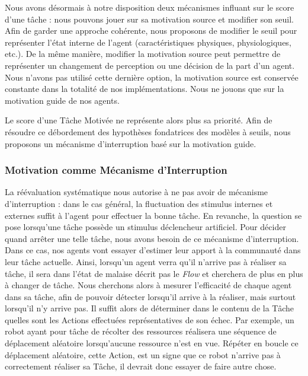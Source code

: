 			Nous avons désormais à notre disposition deux mécanismes influant sur le score d'une tâche : nous pouvons jouer sur sa motivation source et modifier son seuil. Afin de garder une approche cohérente, nous proposons de modifier le seuil pour représenter l'état interne de l'agent (caractéristiques physiques, physiologiques, etc.). De la même manière, modifier la motivation source peut permettre de représenter un changement de perception ou une décision de la part d'un agent. Nous n'avons pas utilisé cette dernière option, la motivation source est conservée constante dans la totalité de nos implémentations. Nous ne jouons que sur la motivation guide de nos agents.
			
			Le score d'une Tâche Motivée ne représente alors plus sa priorité. Afin de résoudre ce débordement des hypothèses fondatrices des modèles à seuils, nous proposons un mécanisme d'interruption basé sur la motivation guide.
			
		\subsubsection{Motivation comme Mécanisme d'Interruption}
		
			La réévaluation systématique nous autorise à ne pas avoir de mécanisme d'interruption : dans le cas général, la fluctuation des stimulus internes et externes suffit à l'agent pour effectuer la bonne tâche. En revanche, la question se pose lorsqu'une tâche possède un stimulus déclencheur artificiel. Pour décider quand arrêter une telle tâche, nous avons besoin de ce mécanisme d'interruption. Dans ce cas, nos agents vont essayer d'estimer leur apport à la communauté dans leur tâche actuelle. Ainsi, lorsqu'un agent verra qu'il n'arrive pas à réaliser sa tâche, il sera dans l'état de malaise décrit pas le \textit{Flow} et cherchera de plus en plus à changer de tâche. Nous cherchons alors à mesurer l'efficacité de chaque agent dans sa tâche, afin de pouvoir détecter lorsqu'il arrive à la réaliser, mais surtout lorsqu'il n'y arrive pas. Il suffit alors de déterminer dans le contenu de la Tâche quelles sont les Actions effectuées représentatives de son échec. Par exemple, un robot ayant pour tâche de récolter des ressources réalisera une séquence de déplacement aléatoire lorsqu'aucune ressource n'est en vue. Répéter en boucle ce déplacement aléatoire, cette Action, est un signe que ce robot n'arrive pas à correctement réaliser sa Tâche, il devrait donc essayer de faire autre chose.
			
